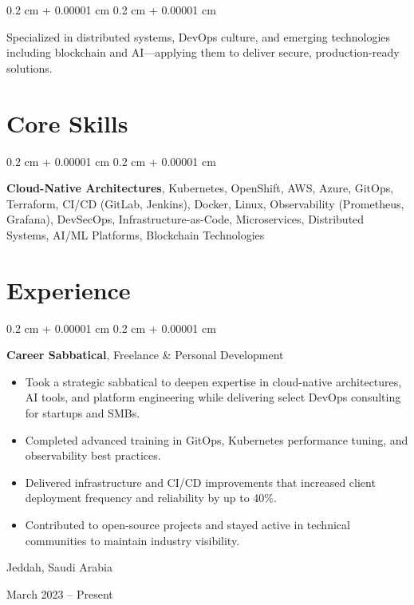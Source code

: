 \documentclass[10pt, letterpaper]{article}
\newenvironment{highlights}{
    \begin{itemize}[
        topsep=0.10 cm,
        parsep=0.10 cm,
        partopsep=0pt,
        itemsep=0pt,
        leftmargin=0.4 cm + 10pt
    ]
}{
    \end{itemize}
} %
\newenvironment{onecolentry}{
    \begin{adjustwidth}{
        0.2 cm + 0.00001 cm
    }{
        0.2 cm + 0.00001 cm
    }
}{
    \end{adjustwidth}
} %
\newenvironment{twocolentry}[2][]{
    \onecolentry
    \def\secondColumn{#2}
    \setcolumnwidth{\fill, 4.5 cm}
    \begin{paracol}{2}
}{
    \switchcolumn \raggedleft \secondColumn
    \end{paracol}
    \endonecolentry
} %
\begin{document}
    \begin{onecolentry}
        Specialized in distributed systems, DevOps culture, and emerging technologies including blockchain and AI—applying them to deliver secure, production-ready solutions.
    \end{onecolentry}

    
    \section{Core Skills}
        \begin{onecolentry}
            \textbf{Cloud-Native Architectures}, Kubernetes, OpenShift, AWS, Azure, GitOps, Terraform,
            CI/CD (GitLab, Jenkins), Docker, Linux, Observability (Prometheus, Grafana),
            DevSecOps, Infrastructure-as-Code, Microservices, Distributed Systems,
            AI/ML Platforms, Blockchain Technologies
        \end{onecolentry}


    \section{Experience}

    \begin{twocolentry}{
        Jeddah, Saudi Arabia

        March 2023 – Present
    }
        \textbf{Career Sabbatical}, Freelance \& Personal Development
        \begin{highlights}
            \item Took a strategic sabbatical to deepen expertise in cloud-native architectures, AI tools, and platform engineering while delivering select DevOps consulting for startups and SMBs.
            \item Completed advanced training in GitOps, Kubernetes performance tuning, and observability best practices.
            \item Delivered infrastructure and CI/CD improvements that increased client deployment frequency and reliability by up to 40\%.
            \item Contributed to open-source projects and stayed active in technical communities to maintain industry visibility.
        \end{highlights}
    \end{twocolentry}

    \vspace{0.2 cm}
\end{document}
